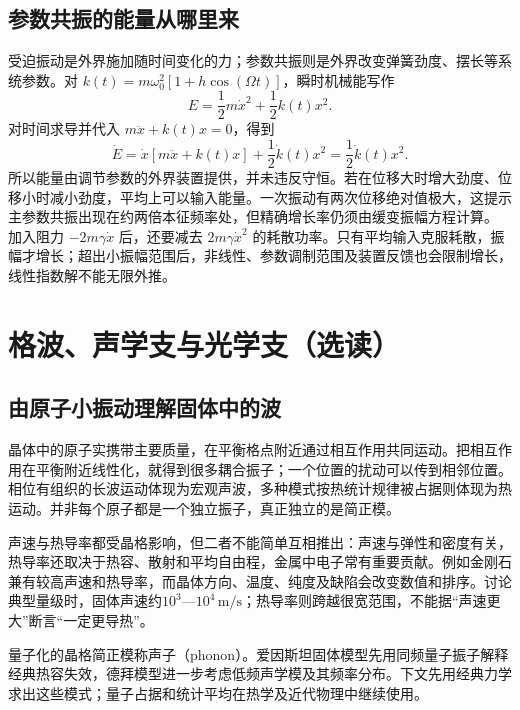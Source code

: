 \subsection{参数共振的能量从哪里来}
受迫振动是外界施加随时间变化的力；参数共振则是外界改变弹簧劲度、摆长等系统参数。对 $k(t)=m\omega_0^2[1+h\cos(\Omega t)]$，瞬时机械能写作
\[
 E=\frac12m\dot x^2+\frac12k(t)x^2.
\]
对时间求导并代入 $m\ddot x+k(t)x=0$，得到
\[
 \dot E=\dot x[m\ddot x+k(t)x]+\frac12\dot k(t)x^2
 =\frac12\dot k(t)x^2.
\]
所以能量由调节参数的外界装置提供，并未违反守恒。若在位移大时增大劲度、位移小时减小劲度，平均上可以输入能量。一次振动有两次位移绝对值极大，这提示主参数共振出现在约两倍本征频率处，但精确增长率仍须由缓变振幅方程计算。
加入阻力 $-2m\gamma\dot x$ 后，还要减去 $2m\gamma\dot x^2$ 的耗散功率。只有平均输入克服耗散，振幅才增长；超出小振幅范围后，非线性、参数调制范围及装置反馈也会限制增长，线性指数解不能无限外推。


\section{格波、声学支与光学支（选读）}\label{ch10:sec:lattice}
\subsection{由原子小振动理解固体中的波}
晶体中的原子实携带主要质量，在平衡格点附近通过相互作用共同运动。把相互作用在平衡附近线性化，就得到很多耦合振子；一个位置的扰动可以传到相邻位置。相位有组织的长波运动体现为宏观声波，多种模式按热统计规律被占据则体现为热运动。并非每个原子都是一个独立振子，真正独立的是简正模。

声速与热导率都受晶格影响，但二者不能简单互相推出：声速与弹性和密度有关，热导率还取决于热容、散射和平均自由程，金属中电子常有重要贡献。例如金刚石兼有较高声速和热导率，而晶体方向、温度、纯度及缺陷会改变数值和排序。讨论典型量级时，固体声速约$10^3$—$10^4\,\mathrm{m/s}$；热导率则跨越很宽范围，不能据“声速更大”断言“一定更导热”。

量子化的晶格简正模称声子（phonon）。爱因斯坦固体模型先用同频量子振子解释经典热容失效，德拜模型进一步考虑低频声学模及其频率分布。下文先用经典力学求出这些模式；量子占据和统计平均在热学及近代物理中继续使用。

